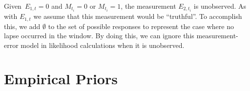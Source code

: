 \documentclass[11pt]{amsart}
\begin{document}
Given~$E_{1,t} = 0$ and $M_{t_i} = 0$ or $M_{t_i} = 1$, the
measurement $E_{2,t_i}$ is unobserved.  As with $E_{1,t}$ we assume
that this measurement would be ``truthful''.  To accomplish this, we
add $\emptyset$ to the set of possible responses to represent the case
where no lapse occurred in the window.
By doing this, we can ignore this measurement-error model in
likelihood calculations when it is unobserved.

\section{Empirical Priors} 
\end{document}
